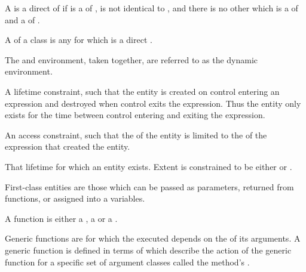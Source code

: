 \begin{optDefinition}
\begin{definitions}
     A  is a direct
     of  if  is a  of
    ,  is not identical to , and there
    is no other  which is a  of  and
    a  of .

     
     A  of a class
     is any  for which  is a direct
    .

     The
     and  environment, taken together, are referred
    to as the dynamic environment.

     A lifetime
    constraint, such that the entity is created on control entering an
    expression and destroyed when control exits the expression.  Thus the entity
    only exists for the time between control entering and exiting the
    expression.

     An access
    constraint, such that the  of the entity is limited to the
     of the expression that created the entity.

     That lifetime for which an entity
    exists.  Extent is constrained to be either  or .

     First-class entities
    are those which can be passed as parameters, returned from functions, or
    assigned into a variables.

     A function is either a
    , a  or a .

      Generic
    functions are  for which the  executed depends on
    the  of its arguments.  A generic function is defined in terms of
     which describe the action of the generic function for a
    specific set of argument classes called the method's .


\end{definitions}
\end{optDefinition}
